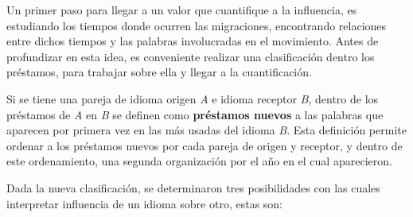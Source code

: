  



Un primer paso para llegar a un valor que cuantifique a la influencia, es estudiando los tiempos donde ocurren las migraciones, encontrando relaciones entre dichos tiempos y las palabras involucradas en el movimiento. Antes de profundizar en esta idea, es conveniente realizar una clasificación dentro los préstamos,  para trabajar sobre ella y llegar a la cuantificación. 

Si se tiene una pareja de idioma origen \textit{A} e idioma receptor
\textit{B},  dentro de los préstamos de \textit{A} en \textit{B} se definen
como  \textbf{préstamos nuevos} a las  palabras que aparecen por primera vez en
las más usadas del idioma \textit{B}. Esta definición permite ordenar a los
préstamos nuevos por cada pareja de origen y receptor, y dentro  de este
ordenamiento, una segunda organización  por el año en el cual aparecieron. 



Dada la nueva clasificación, se determinaron tres posibilidades con las cuales
interpretar influencia de un idioma sobre otro,  estas son: 

